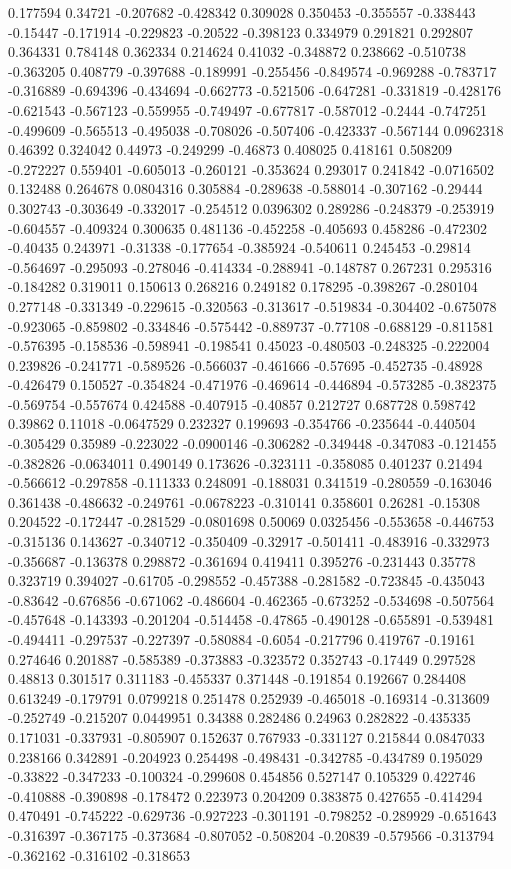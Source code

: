 0.177594 0.34721 -0.207682 -0.428342 0.309028 0.350453 -0.355557 -0.338443 -0.15447 -0.171914 -0.229823 -0.20522 -0.398123 0.334979 0.291821 0.292807 0.364331 0.784148 0.362334 0.214624 0.41032 -0.348872 0.238662 -0.510738 -0.363205 0.408779 -0.397688 -0.189991 -0.255456 -0.849574 -0.969288 -0.783717 -0.316889 -0.694396 -0.434694 -0.662773 -0.521506 -0.647281 -0.331819 -0.428176 -0.621543 -0.567123 -0.559955 -0.749497 -0.677817 -0.587012 -0.2444 -0.747251 -0.499609 -0.565513 -0.495038 -0.708026 -0.507406 -0.423337 -0.567144 0.0962318 0.46392 0.324042 0.44973 -0.249299 -0.46873 0.408025 0.418161 0.508209 -0.272227 0.559401 -0.605013 -0.260121 -0.353624 0.293017 0.241842 -0.0716502 0.132488 0.264678 0.0804316 0.305884 -0.289638 -0.588014 -0.307162 -0.29444 0.302743 -0.303649 -0.332017 -0.254512 0.0396302 0.289286 -0.248379 -0.253919 -0.604557 -0.409324 0.300635 0.481136 -0.452258 -0.405693 0.458286 -0.472302 -0.40435 0.243971 -0.31338 -0.177654 -0.385924 -0.540611 0.245453 -0.29814 -0.564697 -0.295093 -0.278046 -0.414334 -0.288941 -0.148787 0.267231 0.295316 -0.184282 0.319011 0.150613 0.268216 0.249182 0.178295 -0.398267 -0.280104 0.277148 -0.331349 -0.229615 -0.320563 -0.313617 -0.519834 -0.304402 -0.675078 -0.923065 -0.859802 -0.334846 -0.575442 -0.889737 -0.77108 -0.688129 -0.811581 -0.576395 -0.158536 -0.598941 -0.198541 0.45023 -0.480503 -0.248325 -0.222004 0.239826 -0.241771 -0.589526 -0.566037 -0.461666 -0.57695 -0.452735 -0.48928 -0.426479 0.150527 -0.354824 -0.471976 -0.469614 -0.446894 -0.573285 -0.382375 -0.569754 -0.557674 0.424588 -0.407915 -0.40857 0.212727 0.687728 0.598742 0.39862 0.11018 -0.0647529 0.232327 0.199693 -0.354766 -0.235644 -0.440504 -0.305429 0.35989 -0.223022 -0.0900146 -0.306282 -0.349448 -0.347083 -0.121455 -0.382826 -0.0634011 0.490149 0.173626 -0.323111 -0.358085 0.401237 0.21494 -0.566612 -0.297858 -0.111333 0.248091 -0.188031 0.341519 -0.280559 -0.163046 0.361438 -0.486632 -0.249761 -0.0678223 -0.310141 0.358601 0.26281 -0.15308 0.204522 -0.172447 -0.281529 -0.0801698 0.50069 0.0325456 -0.553658 -0.446753 -0.315136 0.143627 -0.340712 -0.350409 -0.32917 -0.501411 -0.483916 -0.332973 -0.356687 -0.136378 0.298872 -0.361694 0.419411 0.395276 -0.231443 0.35778 0.323719 0.394027 -0.61705 -0.298552 -0.457388 -0.281582 -0.723845 -0.435043 -0.83642 -0.676856 -0.671062 -0.486604 -0.462365 -0.673252 -0.534698 -0.507564 -0.457648 -0.143393 -0.201204 -0.514458 -0.47865 -0.490128 -0.655891 -0.539481 -0.494411 -0.297537 -0.227397 -0.580884 -0.6054 -0.217796 0.419767 -0.19161 0.274646 0.201887 -0.585389 -0.373883 -0.323572 0.352743 -0.17449 0.297528 0.48813 0.301517 0.311183 -0.455337 0.371448 -0.191854 0.192667 0.284408 0.613249 -0.179791 0.0799218 0.251478 0.252939 -0.465018 -0.169314 -0.313609 -0.252749 -0.215207 0.0449951 0.34388 0.282486 0.24963 0.282822 -0.435335 0.171031 -0.337931 -0.805907 0.152637 0.767933 -0.331127 0.215844 0.0847033 0.238166 0.342891 -0.204923 0.254498 -0.498431 -0.342785 -0.434789 0.195029 -0.33822 -0.347233 -0.100324 -0.299608 0.454856 0.527147 0.105329 0.422746 -0.410888 -0.390898 -0.178472 0.223973 0.204209 0.383875 0.427655 -0.414294 0.470491 -0.745222 -0.629736 -0.927223 -0.301191 -0.798252 -0.289929 -0.651643 -0.316397 -0.367175 -0.373684 -0.807052 -0.508204 -0.20839 -0.579566 -0.313794 -0.362162 -0.316102 -0.318653 